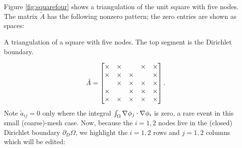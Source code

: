 \medskip\noindent\hrulefill
\begin{example} Figure \ref{fig:squarefour} shows a triangulation of the unit square with five nodes.  The matrix $\tilde A$ has the following nonzero pattern; the zero entries are shown as spaces:\begin{marginfigure}

\caption{A triangulation of a square with five nodes.  The top segment is the Dirichlet boundary.}
\label{fig:squarefour}
\end{marginfigure}%
\begin{equation*}
\tilde A = \begin{bmatrix}
\times & \times &    & \times & \times \\
\times & \times & \times &    & \times \\
   & \times & \times & \times & \times \\
\times &    & \times & \times & \times \\
\times & \times & \times & \times & \times
\end{bmatrix}.
\end{equation*}
Note $\tilde a_{ij}=0$ only where the integral $\int_\Omega \nabla \phi_j \cdot \nabla \phi_i$ is zero, a rare event in this small (coarse)-mesh case.  Now, because the $i=1,2$ nodes live in the (closed) Dirichlet boundary $\partial_D \Omega$, we highlight the $i=1,2$ rows and $j=1,2$ columns which will be edited:

\newcommand{\redX}{{\color{red} \bm{\underline{\X}}}}
\newcommand{\blueX}{{\color{blue} \bm{\underline{\X}}}}


\end{example}
